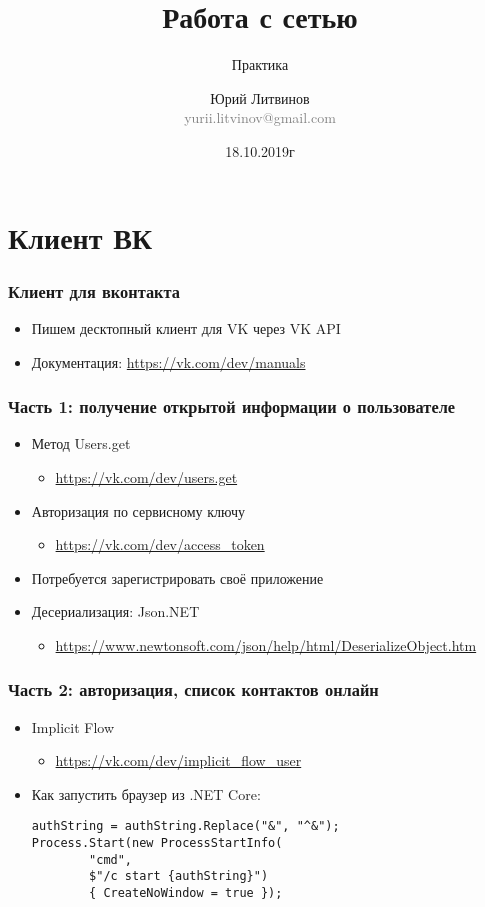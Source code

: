 \documentclass[xetex,mathserif,serif]{beamer}
\title{Работа с сетью}
\subtitle{Практика}
\author[Юрий Литвинов]{Юрий Литвинов\\\small{\textcolor{gray}{yurii.litvinov@gmail.com}}}
\date{18.10.2019г}
\begin{document}
	\frame{\titlepage}

	\section{Клиент ВК}

	\begin{frame}
		\frametitle{Клиент для вконтакта}
		\begin{itemize}
			\item Пишем десктопный клиент для VK через VK API
			\item Документация: \url{https://vk.com/dev/manuals}
		\end{itemize}
	\end{frame}

	\begin{frame}
		\frametitle{Часть 1: получение открытой информации о пользователе}
		\begin{itemize}
			\item Метод Users.get
			\begin{itemize}
				\item \url{https://vk.com/dev/users.get}
			\end{itemize}
			\item Авторизация по сервисному ключу
			\begin{itemize}
				\item \url{https://vk.com/dev/access_token}
			\end{itemize}
			\item Потребуется зарегистрировать своё приложение
			\item Десериализация: Json.NET
			\begin{itemize}
				\item \url{https://www.newtonsoft.com/json/help/html/DeserializeObject.htm}
			\end{itemize}
		\end{itemize}
	\end{frame}

	\begin{frame}[fragile]
		\frametitle{Часть 2: авторизация, список контактов онлайн}
		\begin{itemize}
			\item Implicit Flow
			\begin{itemize}
				\item \url{https://vk.com/dev/implicit_flow_user}
			\end{itemize}
			\item Как запустить браузер из .NET Core:
			\begin{verbatim}
authString = authString.Replace("&", "^&");
Process.Start(new ProcessStartInfo(
        "cmd", 
        $"/c start {authString}") 
        { CreateNoWindow = true });
			\end{verbatim}
		\end{itemize}
	\end{frame}
\end{document}
